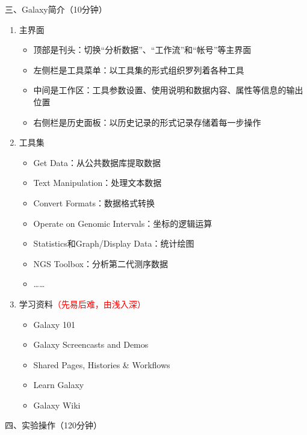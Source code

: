 \documentclass{TIJMUjiaoanSY}
\begin{document}
\vspace*{0.2cm}
\noindent
三、Galaxy简介（10分钟）
\begin{enumerate}
  \item 主界面
  \begin{itemize}
    \item 顶部是刊头：切换“分析数据”、“工作流”和“帐号”等主界面
    \item 左侧栏是工具菜单：以工具集的形式组织罗列着各种工具
    \item 中间是工作区：工具参数设置、使用说明和数据内容、属性等信息的输出位置
    \item 右侧栏是历史面板：以历史记录的形式记录存储着每一步操作
  \end{itemize}
  \item 工具集
  \begin{itemize}
    \item Get Data：从公共数据库提取数据
    \item Text Manipulation：处理文本数据
    \item Convert Formats：数据格式转换
    \item Operate on Genomic Intervals：坐标的逻辑运算
    \item Statistics和Graph/Display Data：统计绘图
    \item NGS Toolbox：分析第二代测序数据
    \item ……
  \end{itemize}
  \item 学习资料\textcolor{red}{（先易后难，由浅入深）}
  \begin{itemize}
    \item Galaxy 101
    \item Galaxy Screencasts and Demos
    \item Shared Pages, Histories \& Workflows
    \item Learn Galaxy
    \item Galaxy Wiki
  \end{itemize}
\end{enumerate}

\otherTail
\newpage
\otherHeader

\noindent
四、实验操作（120分钟）
\end{document}
